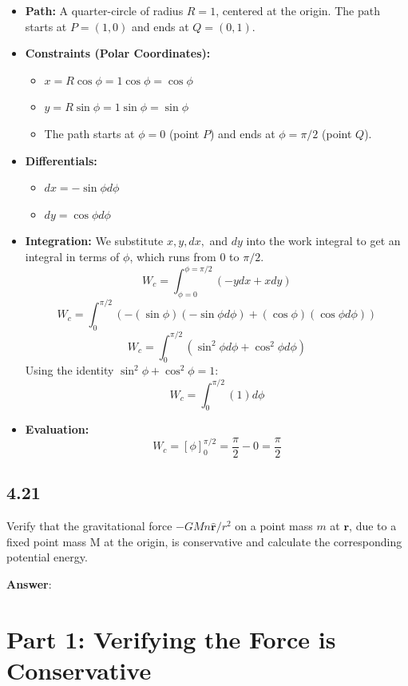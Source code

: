 \documentclass[11pt, a4paper]{article} %
\begin{document}
\begin{itemize}
    \item \textbf{Path:} A quarter-circle of radius $R=1$, centered at the origin. The path starts at $P=(1,0)$ and ends at $Q=(0,1)$.
    \item \textbf{Constraints (Polar Coordinates):}
    \begin{itemize}
        \item $x = R \cos\phi = 1 \cos\phi = \cos\phi$
        \item $y = R \sin\phi = 1 \sin\phi = \sin\phi$
        \item The path starts at $\phi = 0$ (point $P$) and ends at $\phi = \pi/2$ (point $Q$).
    \end{itemize}
    \item \textbf{Differentials:}
    \begin{itemize}
        \item $dx = -\sin\phi d\phi$
        \item $dy = \cos\phi d\phi$
    \end{itemize}
    \item \textbf{Integration:} We substitute $x, y, dx,$ and $dy$ into the work integral to get an integral in terms of $\phi$, which runs from $0$ to $\pi/2$.
    $$W_c = \int_{\phi=0}^{\phi=\pi/2} (-y dx + x dy)$$
    $$W_c = \int_0^{\pi/2} \left( -(\sin\phi) (-\sin\phi d\phi) + (\cos\phi) (\cos\phi d\phi) \right)$$
    $$W_c = \int_0^{\pi/2} \left( \sin^2\phi d\phi + \cos^2\phi d\phi \right)$$
    Using the identity $\sin^2\phi + \cos^2\phi = 1$:
    $$W_c = \int_0^{\pi/2} (1) d\phi$$
    \item \textbf{Evaluation:}
    $$W_c = \left[ \phi \right]_0^{\pi/2} = \frac{\pi}{2} - 0 = \frac{\pi}{2}$$
\end{itemize}

\newpage
\subsection*{4.21}

Verify that the gravitational force $-GMn\hat{\mathbf{r}}/r^2$ on a point mass $m$ at $\mathbf{r}$, due to a fixed point mass M at the origin, is conservative and calculate the corresponding potential energy.

\textbf{Answer}:

\section*{Part 1: Verifying the Force is Conservative}
\end{document}
